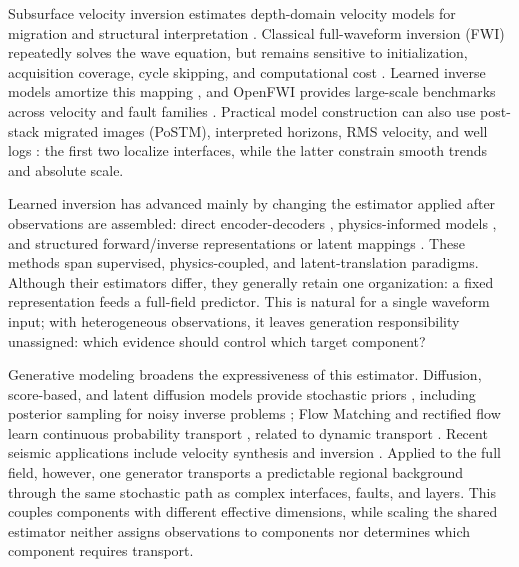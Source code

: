 \documentclass[letterpaper]{article}
\begin{document}
Subsurface velocity inversion estimates depth-domain velocity models for migration and structural interpretation \cite{stolt1978migration}. Classical full-waveform inversion (FWI) repeatedly solves the wave equation, but remains sensitive to initialization, acquisition coverage, cycle skipping, and computational cost \cite{tarantola1984inversion,bunks1995multiscale,pratt1998gaussnewton,virieux2009overview}. Learned inverse models amortize this mapping \cite{arayapolo2018deeptomography,yang2019deeplearning,wu2020inversionnet}, and OpenFWI provides large-scale benchmarks across velocity and fault families \cite{deng2022openfwi}. Practical model construction can also use post-stack migrated images (PoSTM), interpreted horizons, RMS velocity, and well logs \cite{stolt1978migration,dix1955velocities,hampson2001multiattribute}: the first two localize interfaces, while the latter constrain smooth trends and absolute scale.

Learned inversion has advanced mainly by changing the estimator applied after observations are assembled: direct encoder-decoders \cite{wu2020inversionnet,deng2022openfwi,najafi2025svinvnet}, physics-informed models \cite{rashtbehesht2022pinn,jin2022upfwi}, and structured forward/inverse representations or latent mappings \cite{feng2024autolinear,gupta2025gfi}. These methods span supervised, physics-coupled, and latent-translation paradigms. Although their estimators differ, they generally retain one organization: a fixed representation feeds a full-field predictor. This is natural for a single waveform input; with heterogeneous observations, it leaves generation responsibility unassigned: which evidence should control which target component?

Generative modeling broadens the expressiveness of this estimator. Diffusion, score-based, and latent diffusion models provide stochastic priors \cite{ho2020ddpm,song2021scorebased,rombach2022ldm}, including posterior sampling for noisy inverse problems \cite{chung2023diffusionposterior}; Flow Matching and rectified flow learn continuous probability transport \cite{lipman2023flowmatching,liu2023rectifiedflow}, related to dynamic transport \cite{benamou2000computational}. Recent seismic applications include velocity synthesis and inversion \cite{wang2024controllable,wang2024wavediffusion,shan2026reddiffeq}. Applied to the full field, however, one generator transports a predictable regional background through the same stochastic path as complex interfaces, faults, and layers. This couples components with different effective dimensions, while scaling the shared estimator neither assigns observations to components nor determines which component requires transport.
\end{document}
